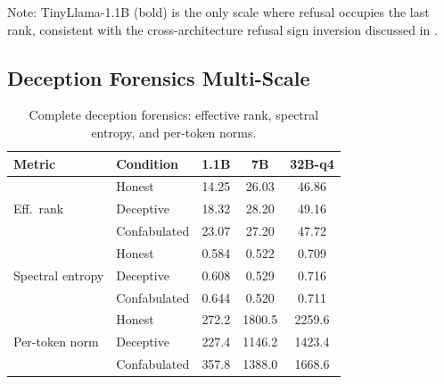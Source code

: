 \documentclass[11pt,a4paper]{article}
\begin{document}
\begin{table}[H]
\centering
\caption{Category rank order by effective rank. Coding is rank \#1 at every scale. The bottom ranks are occupied by free generation, rote, and ambiguous content.}
\label{tab:rank_order}
\end{table}

Note: TinyLlama-1.1B (bold) is the only scale where refusal occupies the last rank, consistent with the cross-architecture refusal sign inversion discussed in .

\subsection{Deception Forensics Multi-Scale}

\begin{table}[H]
\centering
\caption{Complete deception forensics: effective rank, spectral entropy, and per-token norms.}
\label{tab:deception_full}
\begin{tabular}{llccc}
\toprule
\textbf{Metric} & \textbf{Condition} & \textbf{1.1B} & \textbf{7B} & \textbf{32B-q4} \\
\midrule
\multirow{3}{*}{Eff.\ rank} & Honest & 14.25 & 26.03 & 46.86 \\
& Deceptive & 18.32 & 28.20 & 49.16 \\
& Confabulated & 23.07 & 27.20 & 47.72 \\
\midrule
\multirow{3}{*}{Spectral entropy} & Honest & 0.584 & 0.522 & 0.709 \\
& Deceptive & 0.608 & 0.529 & 0.716 \\
& Confabulated & 0.644 & 0.520 & 0.711 \\
\midrule
\multirow{3}{*}{Per-token norm} & Honest & 272.2 & 1800.5 & 2259.6 \\
& Deceptive & 227.4 & 1146.2 & 1423.4 \\
& Confabulated & 357.8 & 1388.0 & 1668.6 \\
\bottomrule
\end{tabular}
\end{table}
\end{document}
